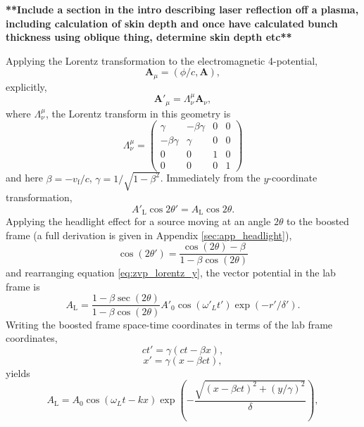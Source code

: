 \textbf{**Include a section in the intro describing laser reflection off a plasma, including calculation of skin depth and once have calculated bunch thickness using oblique thing, determine skin depth etc**}

Applying the Lorentz transformation to the electromagnetic 4-potential,
\begin{equation}
	\mathbf{A}_\mu = (\phi/c,\mathbf{A}),
\end{equation}
explicitly,
\begin{equation}
	\mathbf{A}'_\mu = \Lambda^\mu_\nu \mathbf{A}_\nu,
\end{equation}
where $\Lambda^\mu_\nu$, the Lorentz transform in this geometry is
\begin{equation}\label{eq:zvp_lorentz}
	\Lambda^\mu_\nu = \begin{pmatrix}
			\gamma & -\beta\gamma & 0 & 0\\
			-\beta\gamma & \gamma & 0 & 0\\
			0 & 0& 1 & 0\\
			0 & 0 & 0 & 1
	\end{pmatrix}
\end{equation}
and here $\beta = -v_\mathrm{f}/c$, $\gamma = 1/\sqrt{1-\beta^2}$. Immediately from the $y$-coordinate transformation,
\begin{equation}\label{eq:zvp_lorentz_y}
	A'_\mathrm{L}\cos{2\theta'} = A_\mathrm{L}\cos{2\theta}.
\end{equation}
Applying the headlight effect for a source moving at an angle $2\theta$ to the boosted frame (a full derivation is given in Appendix \ref{sec:app_headlight}),
\begin{equation}
	\cos{(2\theta')} = \frac{\cos{(2\theta)}-\beta}{1 - \beta\cos{(2\theta)}}
\end{equation}
and rearranging equation \ref{eq:zvp_lorentz_y}, the vector potential in the lab frame is
\begin{equation}\label{eq:zvp_labA}
	A_\mathrm{L} = \frac{1-\beta \sec{(2\theta)}}{1 - \beta\cos{(2\theta)}} A'_0\cos{(\omega'_L t')}\exp{(-r'/\delta')}.
\end{equation}
Writing the boosted frame space-time coordinates in terms of the lab frame coordinates,
\begin{equation}
	ct' = \gamma(ct-\beta x),
\end{equation}
\begin{equation}
	x' = \gamma(x-\beta ct),
\end{equation}
yields
\begin{equation}\label{eq:zvp_labAfull}
	A_\mathrm{L} =  A_0\cos{(\omega_L t - kx)}\exp{\left(-\frac{\sqrt{(x-\beta ct)^2+(y/\gamma)^2}}{\delta}\right)},
\end{equation}
